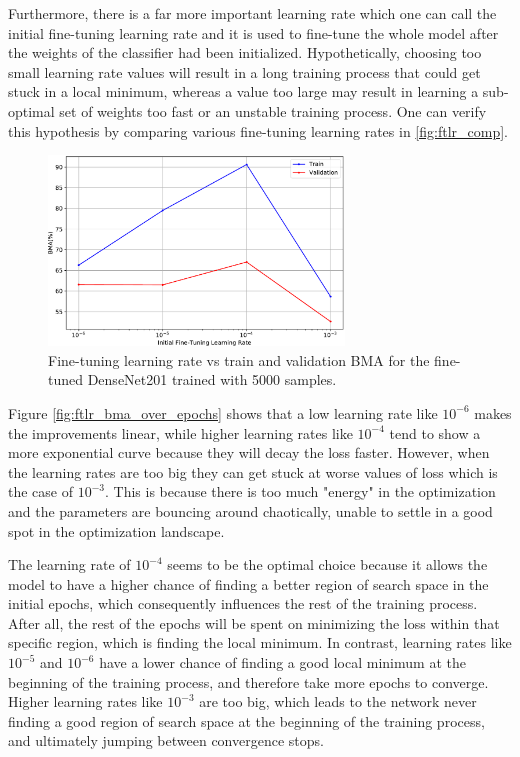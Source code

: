     Furthermore, there is a far more important learning rate which one can call the initial fine-tuning learning rate and it is used to fine-tune the whole model after the weights of the classifier had been initialized. Hypothetically, choosing too small learning rate values will result in a long training process that could get stuck in a local minimum, whereas a value too large may result in learning a sub-optimal set of weights too fast or an unstable training process. One can verify this hypothesis by comparing various fine-tuning learning rates in \autoref{fig:ftlr_comp}. \par
    \begin{figure}[ht]
        \centering
        \includegraphics[width=0.7\textwidth]{figs/densenet201_ftlr_comp.pdf}
        \caption{Fine-tuning learning rate vs train and validation \ac{BMA} for the fine-tuned DenseNet201 trained with 5000 samples.}
        \label{fig:ftlr_comp}
    \end{figure}
    
    Figure \ref{fig:ftlr_bma_over_epochs} shows that a low learning rate like $10^{-6}$ makes the improvements linear, while higher learning rates like $10^{-4}$ tend to show a more exponential curve because they will decay the loss faster. However, when the learning rates are too big they can get stuck at worse values of loss which is the case of $10^{-3}$. This is because there is too much "energy" in the optimization and the parameters are bouncing around chaotically, unable to settle in a good spot in the optimization landscape. \par
    
    The learning rate of $10^{-4}$ seems to be the optimal choice because it allows the model to have a higher chance of finding a better region of search space in the initial epochs, which consequently influences the rest of the training process. After all, the rest of the epochs will be spent on minimizing the loss within that specific region, which is finding the local minimum. In contrast, learning rates like $10^{-5}$ and $10^{-6}$ have a lower chance of finding a good local minimum at the beginning of the training process, and therefore take more epochs to converge. Higher learning rates like $10^{-3}$ are too big, which leads to the network never finding a good region of search space at the beginning of the training process, and ultimately jumping between convergence stops. \par
    
